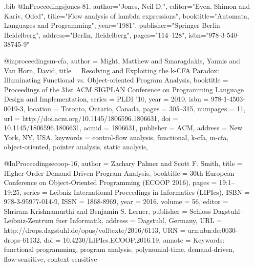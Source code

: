 \documentclass[12pt, oneside]{book}
\begin{document}
\begin{filecontents*}{\jobname.bib}
@InProceedings{jones-81,
  author="Jones, Neil D.",
  editor="Even, Shimon
  and Kariv, Oded",
  title="Flow analysis of lambda expressions",
  booktitle="Automata, Languages and Programming",
  year="1981",
  publisher="Springer Berlin Heidelberg",
  address="Berlin, Heidelberg",
  pages="114--128",
  isbn="978-3-540-38745-9"
}

@inproceedings{m-cfa,
  author = {Might, Matthew and Smaragdakis, Yannis and Van Horn, David},
  title = {Resolving and Exploiting the k-CFA Paradox: Illuminating Functional vs. Object-oriented Program Analysis},
  booktitle = {Proceedings of the 31st ACM SIGPLAN Conference on Programming Language Design and Implementation},
  series = {PLDI '10},
  year = {2010},
  isbn = {978-1-4503-0019-3},
  location = {Toronto, Ontario, Canada},
  pages = {305--315},
  numpages = {11},
  url = {http://doi.acm.org/10.1145/1806596.1806631},
  doi = {10.1145/1806596.1806631},
  acmid = {1806631},
  publisher = {ACM},
  address = {New York, NY, USA},
  keywords = {control-flow analysis, functional, k-cfa, m-cfa, object-oriented, pointer analysis, static analysis},
}

@InProceedings{ecoop-16,
  author = {Zachary Palmer and Scott F. Smith},
  title = {{Higher-Order Demand-Driven Program Analysis}},
  booktitle = {30th European Conference on Object-Oriented Programming (ECOOP 2016)},
  pages = {19:1--19:25},
  series = {Leibniz International Proceedings in Informatics (LIPIcs)},
  ISBN = {978-3-95977-014-9},
  ISSN = {1868-8969},
  year = {2016},
  volume = {56},
  editor = {Shriram Krishnamurthi and Benjamin S. Lerner},
  publisher = {Schloss Dagstuhl--Leibniz-Zentrum fuer Informatik},
  address = {Dagstuhl, Germany},
  URL =  {http://drops.dagstuhl.de/opus/volltexte/2016/6113},
  URN =  {urn:nbn:de:0030-drops-61132},
  doi =  {10.4230/LIPIcs.ECOOP.2016.19},
  annote = {Keywords: functional programming, program analysis, polynomial-time, demand-driven, flow-sensitive, context-sensitive}
}


\end{filecontents*}
\end{document}
